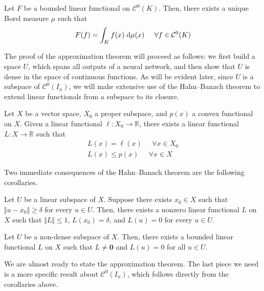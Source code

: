 \documentclass{article}
\numberwithin{equation}{subsection}
\begin{document}
\begin{theorem}[Representation]
    Let $F$ be a bounded linear functional on $\mathcal{C}^0(K)$. Then, there exists a unique Borel measure $\mu$ such that 
    \begin{equation*}
        F(f) = \int_K f(x) \;\text{d} \mu(x) \;\;\;\;\; \forall f \in \mathcal{C}^0(K)
    \end{equation*}
\end{theorem}

The proof of the approximation theorem will proceed as follows: we first build a space $U$, which spans all outputs of a neural network, and then show that $U$ is dense in the space of continuous functions. As will be evident later, since $U$ is a subspace of $\mathcal{C}^{0}(I_n)$, we will make extensive use of the Hahn–Banach theorem to extend linear functionals from a subspace to its closure.

\begin{theorem}
    Let $X$ be a vector space, $X_0$ a proper subspace, and $p(x)$ a convex functional on $X$. Given a linear functional $\ell : X_0 \to \mathbb{R}$, there exists a linear functional $L : X \to \mathbb{R}$ such that
    \begin{gather*}
        L(x) = \ell(x) \;\;\;\;\; \forall x \in X_0 \\
        L(x) \leq p(x) \;\;\;\;\; \forall x \in X
    \end{gather*}
\end{theorem}

Two immediate consequences of the Hahn–Banach theorem are the following corollaries.

\begin{corollary}
Let $U$ be a linear subspace of $X$. Suppose there exists $x_0 \in X$ such that $\Vert u - x_0 \Vert \geq \delta$ for every $u \in U$. Then, there exists a nonzero linear functional $L$ on $X$ such that $\Vert L \Vert \leq 1$, $L(x_0) = \delta$, and $L(u) = 0$ for every $u \in U$.
\end{corollary}

\begin{corollary}
    Let $U$ be a non-dense subspace of $X$. Then, there exists a bounded linear functional $L$ on $X$ such that $L \neq \textbf{0}$ and $L(u) = 0$ for all $u \in U$.
\end{corollary}

We are almost ready to state the approximation theorem. The last piece we need is a more specific result about $\mathcal{C}^0(I_n)$, which follows directly from the corollaries above.
\end{document}
